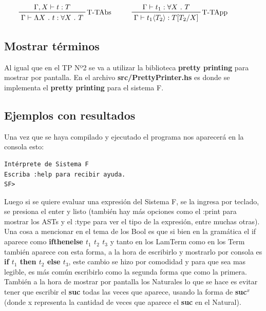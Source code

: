 \documentclass[12pt, titlepage, a4paper]{article}
\begin{document}
\begin{displaymath}
    \prftree[r]{T-TAbs}{\Gamma, X \vdash t : T}{\Gamma \vdash \Lambda X \ . \ t : \forall X \ . \ T} \hspace{1cm}
    \prftree[r]{T-TApp}{\Gamma \vdash t_1 : \forall X \ . \ T}{\Gamma \vdash t_1 \langle T_2 \rangle : T[T_2/X]} \hspace{1cm}
\end{displaymath}

\subsection{Mostrar términos}
Al igual que en el TP Nº2 \cite{tp2:lambdaCalculoSimpleTipado} se va a utilizar la biblioteca \textbf{pretty printing} para mostrar por 
pantalla. En el archivo
\textbf{src/PrettyPrinter.hs} es donde se implementa el \textbf{pretty printing} para el sistema F.

\subsection{Ejemplos con resultados}
Una vez que se haya compilado y ejecutado el programa nos aparecerá en la consola esto:

\begin{verbatim}
Intérprete de Sistema F
Escriba :help para recibir ayuda.
SF>
\end{verbatim}

Luego si se quiere evaluar una expresión del Sistema F, se la ingresa por teclado, se presiona el enter y listo 
(también hay más opciones como el :print para mostrar los ASTs y el :type para ver el tipo de la expresión, entre muchas otras). \\

Una cosa a mencionar en el tema de los Bool es que si bien en la gramática el if aparece como \textbf{ifthenelse $t_1$ $t_2$ $t_3$} y 
tanto en los LamTerm como en los Term también aparece con esta forma, a la hora de escribirlo y mostrarlo por consola es 
\textbf{if $t_1$ then $t_2$ else $t_3$}, este cambio se hizo por comodidad y para que sea mas legible, es más común escribirlo como la segunda forma que como 
la primera.\\

También a la hora de mostrar por pantalla los Naturales lo que se hace es evitar tener que escribir el \textbf{suc} todas las veces que aparece, usando 
la forma de \textbf{suc$^x$} (donde x representa la cantidad de veces que aparece el \textbf{suc} en el Natural). \\
\end{document}
